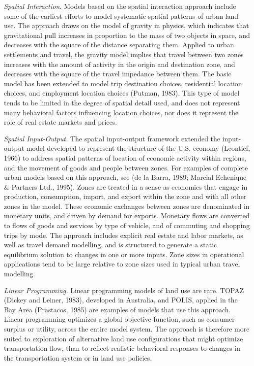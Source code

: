 \emph{Spatial Interaction.}  Models based on the spatial interaction approach include some of the earliest efforts to model systematic spatial patterns of urban land use.  The approach draws on the model of gravity in physics, which indicates that gravitational pull increases in proportion to the mass of two objects in space, and decreases with the square of the distance separating them.  Applied to urban settlements and travel, the gravity model implies that travel between two zones increases with the amount of activity in the origin and destination zone, and decreases with the square of the travel impedance between them.  The basic model has been extended to model trip destination choices, residential location choices, and employment location choices (Putman, 1983). This type of model tends to be limited in the degree of spatial detail used, and does not represent many behavioral factors influencing location choices, nor does it represent the role of real estate markets and prices.

\emph{Spatial Input-Output.}  The spatial input-output framework extended the input-output model developed to represent the structure of the U.S. economy (Leontief, 1966) to address spatial patterns of location of economic activity within regions, and the movement of goods and people between zones. For examples of complete urban models based on this approach, see (de la Barra, 1989; Marcial Echenique \& Partners Ltd., 1995).  Zones are treated in a sense as economies that engage in production, consumption, import, and export within the zone and with all other zones in the model.  These economic exchanges between zones are denominated in monetary units, and driven by demand for exports.  Monetary flows are converted to flows of goods and services by type of vehicle, and of commuting and shopping trips by mode.  The approach includes explicit real estate and labor markets, as well as travel demand modelling, and is structured to generate a static equilibrium solution to changes in one or more inputs.  Zone sizes in operational applications tend to be large relative to zone sizes used in typical urban travel modelling.

\emph{Linear Programming.}    Linear programming models of land use are rare. TOPAZ (Dickey and Leiner, 1983), developed in Australia, and POLIS, applied in the Bay Area (Prastacos, 1985) are examples of models that use this approach.  Linear programming optimizes a global objective function, such as consumer surplus or utility, across the entire model system.  The approach is therefore more suited to exploration of alternative land use configurations that might optimize transportation flow, than to reflect realistic behavioral responses to changes in the transportation system or in land use policies.

